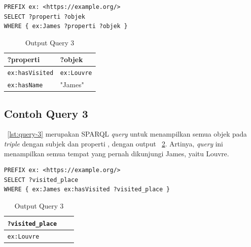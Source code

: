 \begin{listing}[H]
  \begin{verbatim}
PREFIX ex: <https://example.org/>
SELECT ?properti ?objek
WHERE { ex:James ?properti ?objek }
  \end{verbatim}
  \caption{Query 2}
  \label{lst:query-2}
\end{listing}

\begin{table}
  \centering
  \begin{tabular}{|l|l|} \hline
    ?properti              & ?objek             \\\hline \hline
    \texttt{ex:hasVisited} & \texttt{ex:Louvre} \\\hline
    \texttt{ex:hasName}    & "James"            \\\hline
  \end{tabular}
  \caption{Output Query 3}
  \label{tab:output-query-2}
\end{table}

\subsection{Contoh Query 3}
\label{sec:contoh-query-3}

\lst~\ref{lst:query-3} merupakan SPARQL \textit{query} untuk menampilkan semua objek pada
\textit{triple} dengan subjek  dan properti , dengan output
\tab~\ref{tab:output-query-3}. Artinya, \textit{query} ini menampilkan semua tempat yang pernah
dikunjungi James, yaitu Louvre.

\begin{listing}[H]
  \begin{verbatim}
PREFIX ex: <https://example.org/>
SELECT ?visited_place
WHERE { ex:James ex:hasVisited ?visited_place }
  \end{verbatim}
  \caption{Query 3}
  \label{lst:query-3}
\end{listing}

\begin{table}
  \centering
  \begin{tabular}{|l|l|l|} \hline
    \texttt{?visited\_place} \\ \hline \hline
    \texttt{ex:Louvre}       \\ \hline
  \end{tabular}
  \caption{Output Query 3}
  \label{tab:output-query-3}
\end{table}

